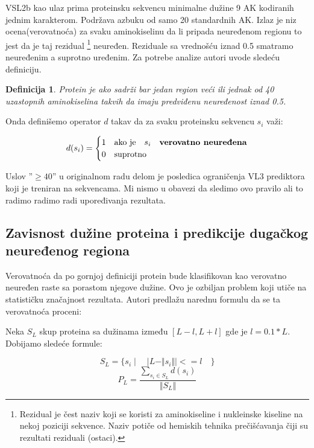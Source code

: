 VSL2b kao ulaz prima proteinsku sekvencu minimalne dužine 9 AK kodiranih jednim
karakterom. Podržava azbuku od samo 20 standardnih AK.  Izlaz je niz
ocena(verovatnoća) za svaku aminokiselinu da li pripada neuređenom regionu to
jest da je taj rezidual
\footnote{ Rezidual je čest naziv koji se koristi za aminokiseline i nukleinske
  kiseline na nekoj poziciji sekvence.  Naziv potiče od hemiskih tehnika
  prečišćavanja čiji su rezultati reziduali (ostaci).
} neuređen. Reziduale sa vrednošću iznad 0.5 smatramo neuređenim a suprotno
uređenim. Za potrebe analize autori \parencite{Xie2007} uvode sledeću definiciju.

\newtheorem{mydef}{Definicija}
\begin{mydef}
\label{pdis_def}
Protein je  
ako sadrži bar jedan region veći ili jednak od 40 uzastopnih aminokiselina
takvih da imaju \textit{predviđenu neuređenost} iznad 0.5. 
\end{mydef}

Onda definišemo operator $d$ takav da za svaku proteinsku sekvencu $s_i$ važi:


\[   
  d(s_i) = 
    \begin{cases}
      1 & \text{ako je} \quad s_i \quad \textbf{verovatno neuređena}\\
      0 & \text{suprotno}
    \end{cases}
\]

Uslov ''$\ge40$'' u originalnom radu delom je posledica ograničenja VL3
prediktora koji je treniran na  sekvencama. Mi nismo u obavezi
da sledimo ovo pravilo ali to radimo radimo radi upoređivanja rezultata.


\subsection{Zavisnost dužine proteina i predikcije dugačkog neuređenog regiona}

Verovatnoća da po gornjoj definiciji protein bude klasifikovan kao verovatno
neuređen raste sa porastom njegove dužine. Ovo je ozbiljan problem koji utiče
na statističku značajnost rezultata. Autori \parencite{Xie2007} 
predlažu narednu formulu da se ta verovatnoća proceni:

Neka $S_L$ skup proteina sa dužinama između $[L-l, L+l]$ gde je $l
= 0.1*L$. Dobijamo sledeće formule:

$$ S_L = \{s_i \mid \quad | L -  \Vert s_i \Vert | <= l \quad   \}$$
$$ P_L = \dfrac{ \sum_{s_i \in S_L} d(s_i)} {\Vert S_L \Vert}$$


